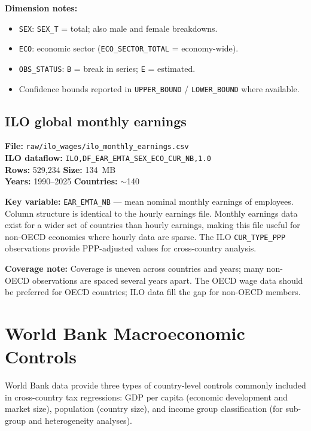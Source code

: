 \documentclass[11pt,a4paper]{article}
\newcommand{\code}[1]{\texttt{#1}}
\begin{document}
\noindent\textbf{Dimension notes:}
\begin{itemize}[noitemsep]
    \item \texttt{SEX}: \texttt{SEX\_T} = total; also male and female breakdowns.
    \item \texttt{ECO}: economic sector (\texttt{ECO\_SECTOR\_TOTAL} = economy-wide).
    \item \texttt{OBS\_STATUS}: \texttt{B} = break in series; \texttt{E} = estimated.
    \item Confidence bounds reported in \texttt{UPPER\_BOUND} / \texttt{LOWER\_BOUND} where available.
\end{itemize}

\subsection{ILO global monthly earnings}

\textbf{File:} \texttt{raw/ilo\_wages/ilo\_monthly\_earnings.csv}\\
\textbf{ILO dataflow:} \texttt{ILO,DF\_EAR\_EMTA\_SEX\_ECO\_CUR\_NB,1.0}\\
\textbf{Rows:} 529{,}234 \quad \textbf{Size:} 134~MB\\
\textbf{Years:} 1990--2025 \quad \textbf{Countries:} $\sim$140

\noindent\textbf{Key variable:} \code{EAR\_EMTA\_NB} --- mean nominal monthly earnings of employees.  Column structure is identical to the hourly earnings file.  Monthly earnings data exist for a wider set of countries than hourly earnings, making this file useful for non-OECD economies where hourly data are sparse.  The ILO \texttt{CUR\_TYPE\_PPP} observations provide PPP-adjusted values for cross-country analysis.

\noindent\textbf{Coverage note:} Coverage is uneven across countries and years; many non-OECD observations are spaced several years apart.  The OECD wage data should be preferred for OECD countries; ILO data fill the gap for non-OECD members.


\section{World Bank Macroeconomic Controls}\label{sec:worldbank}

World Bank data provide three types of country-level controls commonly included
in cross-country tax regressions: GDP per capita (economic development and
market size), population (country size), and income group classification (for
sub-group and heterogeneity analyses).
\end{document}
